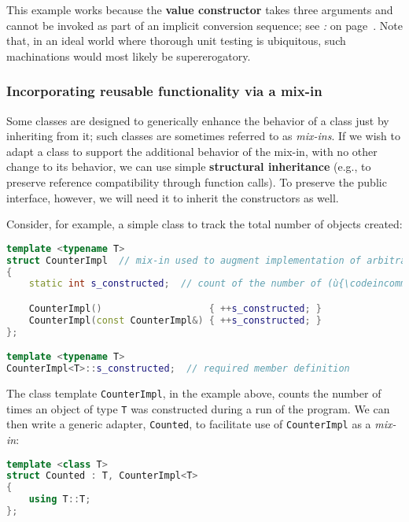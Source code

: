 \noindent This example works because the \textbf{value constructor} takes three
arguments and cannot be invoked as part of an implicit conversion
sequence; see \textit{: } on page~\pageref{beware-of-inheriting-implicit-constructors}. Note that, in an ideal
world where thorough unit testing is ubiquitous, such machinations would
most likely be supererogatory.

\subsubsection[Incorporating reusable functionality via a mix-in]{Incorporating reusable functionality via a mix-in}\label{incorporating-reusable-functionality-via-a-mix-in-class}

Some classes are designed to generically enhance the behavior of a class
just by inheriting from it; such classes are sometimes referred to as
\emph{mix-ins}. If we wish to adapt a class to support the additional
behavior of the mix-in, with no other change to its behavior, we can use
simple \textbf{structural inheritance} (e.g., to preserve reference
compatibility through function calls). To preserve the public interface,
however, we will need it to inherit the constructors as well.

Consider, for example, a simple class to track the total number of
objects created:

\begin{lstlisting}[language=C++]
template <typename T>
struct CounterImpl  // mix-in used to augment implementation of arbitrary type
{
    static int s_constructed;  // count of the number of (ù{\codeincomments{T}}ù) objects constructed

    CounterImpl()                   { ++s_constructed; }
    CounterImpl(const CounterImpl&) { ++s_constructed; }
};

template <typename T>
CounterImpl<T>::s_constructed;  // required member definition
\end{lstlisting}

\noindent The class template \texttt{CounterImpl}, in the example above, counts the number of
times an object of type \texttt{T} was constructed during a run of the
program. We can then write a generic adapter, \texttt{Counted}, to
facilitate use of \texttt{CounterImpl} as a \emph{mix-in}:

\begin{lstlisting}[language=C++]
template <class T>
struct Counted : T, CounterImpl<T>
{
    using T::T;
};
\end{lstlisting}

